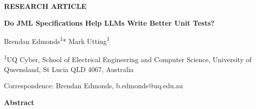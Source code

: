 \documentclass[11pt]{article}
\begin{document}
\linenumbers

\noindent\textbf{RESEARCH ARTICLE}
\vspace{1em}

\begin{center}
{\LARGE\bfseries Do JML Specifications Help LLMs Write Better Unit Tests?}
\vspace{1.5em}

{\large Brendan Edmonds\textsuperscript{1}* \quad Mark Utting\textsuperscript{1}}
\vspace{0.5em}

{\small\textsuperscript{1}UQ Cyber, School of Electrical Engineering and Computer Science, University of Queensland, St Lucia QLD 4067, Australia}
\vspace{0.5em}

{\small *Correspondence: Brendan Edmonds, b.edmonds@uq.edu.au}
\end{center}

\vspace{1em}

\noindent\textbf{Abstract}
\vspace{0.5em}
\end{document}
